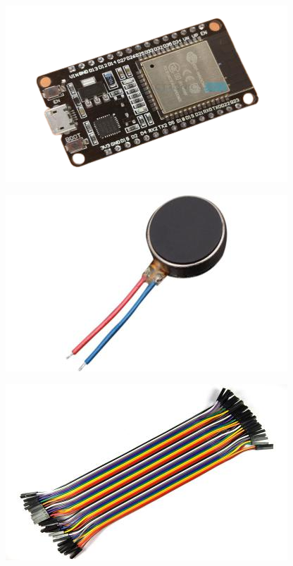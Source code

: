 \documentclass[
	11pt, %
	aspectratio=169, %
]{beamer}
\begin{document}
\begin{frame}
\begin{center}
			\begin{minipage}{0.30\textwidth}
		\includegraphics[width=\textwidth]{./resized_400x250/esp32.png}
	\end{minipage}\hfill
	\begin{minipage}{0.30\textwidth}
		\includegraphics[width=\textwidth]{./resized_400x250/vibrating motor.jpg}
	\end{minipage}\hfill
	\begin{minipage}{0.30\textwidth}
		\includegraphics[width=\textwidth]{./resized_400x250/wire.jpg}
	\end{minipage}
	\end{center}
	
\end{frame}
\end{document}
